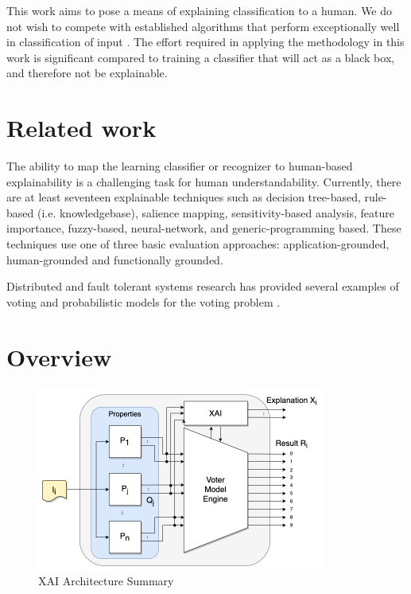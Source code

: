 \documentclass[conference]{IEEEtran}
\begin{document}
This work aims to pose a means of explaining classification to a human.  We do not wish to compete with established algorithms that perform exceptionally well in classification of input \cite{keysers07} \cite{lecun98} \cite{schm2012}.  The effort required in applying the methodology in this work is significant compared to training a classifier that will act as a black box, and therefore not be explainable.

\section{Related work}

The ability to map the learning classifier or recognizer to human-based explainability is a challenging task for human understandability.  Currently, there are at least seventeen explainable techniques such as
decision tree-based, rule-based (i.e. knowledgebase), salience mapping,
sensitivity-based analysis, feature importance, fuzzy-based, neural-network, and generic-programming based.  These techniques use one of three basic evaluation approaches: application-grounded, human-grounded and functionally grounded. \cite{BlackBox18} \cite{Arrieta2020ExplainableAI} \cite{Survey18} \cite{Fuzzy19} \cite{Hagras18}  \cite{GP18}

Distributed and fault tolerant systems research has provided several examples of voting \cite{avizienis} and probabilistic models for the voting problem \cite{blough}.

\section{Overview}

 \begin{figure}[htbp]
\centerline{\includegraphics[width=95mm]{./images/voting_prop_nn_2.png}}
\caption{XAI Architecture Summary}
\label{voting}
\end{figure}
\end{document}
